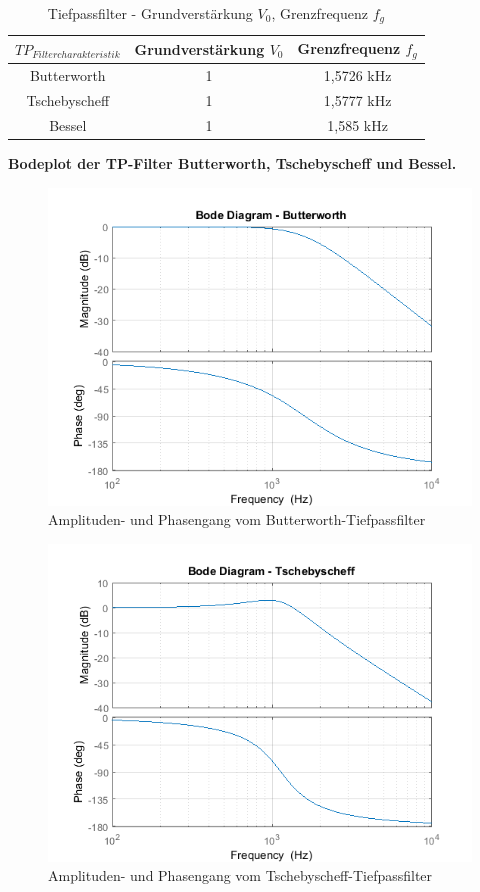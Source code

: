 \begin{table}[h]
	\centering
	\begin{tabular}{c|c|c}
		$TP_{Filtercharakteristik}$ & Grundverstärkung $V_{0}$	& Grenzfrequenz $f_{g}$	\\
		\hline
		\hline
		Butterworth	& 1	& 1,5726 kHz	\\
		Tschebyscheff	& 1	& 1,5777 kHz	\\
		Bessel	& 1	& 1,585 kHz 	\\
	\end{tabular}
	\caption{Tiefpassfilter - Grundverstärkung $V_{0}$, Grenzfrequenz $f_{g}$ }
	\label{tab:Tiefpaesse_Grundverstaerkung}
\end{table}

\newpage

\textbf{Bodeplot der TP-Filter Butterworth, Tschebyscheff und Bessel.}

\begin{figure}[h]
\centering
\includegraphics[width=0.6\linewidth]{Bilder/TP_Butterworth}
\caption{Amplituden- und Phasengang vom Butterworth-Tiefpassfilter}
\label{fig:TP_Butterworth}
\end{figure}
 
 
\begin{figure}[h]
\centering
\includegraphics[width=0.6\linewidth]{Bilder/TP_Tschebyscheff}
\caption{Amplituden- und Phasengang vom Tschebyscheff-Tiefpassfilter}
\label{fig:TP_Tschebyscheff}
\end{figure}

